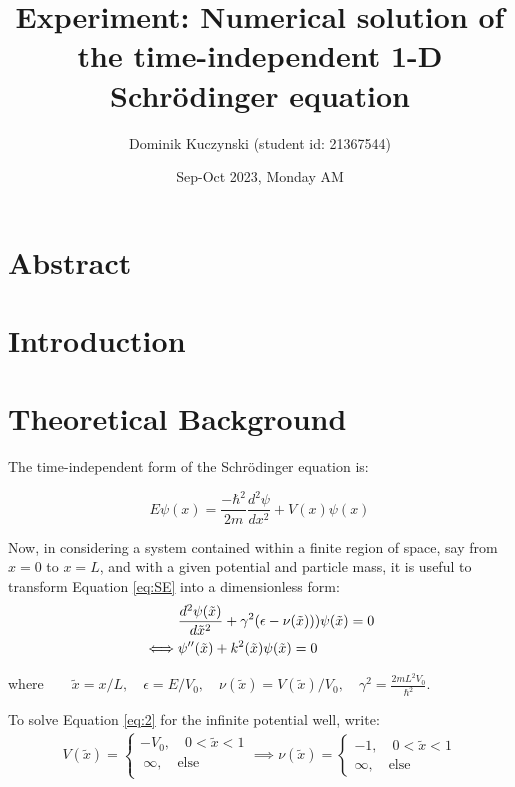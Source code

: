 \documentclass[11pt]{article}
\title{\vspace{-2cm}\textbf{Experiment: Numerical solution of the time-independent 1-D Schr{\"o}dinger equation}}
\author{Dominik Kuczynski (student id: 21367544)}
\date{Sep-Oct 2023, Monday AM}
\begin{document}
\maketitle

\section{Abstract}


\section{Introduction}

\section{Theoretical Background}

The time-independent form of the Schr{\"o}dinger equation is:

\begin{equation}
  E \psi(x) = \frac{-\hbar^2}{2m}\frac{d^2\psi}{dx^2}+V(x)\psi(x)
  \label{eq:SE}
\end{equation}

Now, in considering a system contained within a finite region of space, say from
$x=0$ to $x=L$, and with a given potential and particle mass, it is useful to 
transform Equation \ref{eq:SE} into a dimensionless form:
\begin{align}
     &\frac{d^2 \psi(\tilde{x})}{d\tilde{x}^2}+\gamma^2 (\epsilon-\nu(\tilde{x})))\psi(\tilde{x})=0
     \label{eq:2}\\ 
  \iff &\psi''(\tilde{x})+k^2(\tilde{x})\psi(\tilde{x})=0\notag
\end{align}

where$\qquad\tilde{x}=x/L,\quad \epsilon=E/V_0,\quad \nu(\tilde{x})=V(\tilde{x})/V_0,\quad \gamma^2=\frac{2mL^2V_0}{\hbar^2}$.

To solve Equation \ref{eq:2} for the infinite potential well, write:
\begin{align*}
  V(\tilde{x})=
  \begin{cases}
    -V_0,\quad 0<\tilde{x}<1\\
    \ \infty,\quad \text{else}\\
  \end{cases}
  \implies \nu(\tilde{x})=
  \begin{cases}
    -1,\quad 0<\tilde{x}<1\\
    \infty,\quad \text{else}
  \end{cases}
\end{align*}
\end{document}
